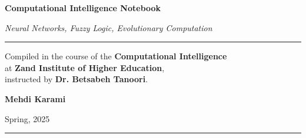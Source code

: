 \begin{titlepage}
    \centering
    \vspace*{2cm}

    {\Huge\bfseries Computational Intelligence Notebook \par}
    \vspace{0.5cm}

    {\large\textit{Neural Networks, Fuzzy Logic, Evolutionary Computation} \par}
    \vspace{0.25cm}
    \rule{\textwidth}{0.4pt}
    \vfill

    \begin{minipage}{0.85\textwidth}
        \centering
        \color{accent}
        \large
        Compiled in the course of the \textbf{Computational Intelligence}\\ at \textbf{Zand Institute of Higher Education}, \\ instructed by \textbf{Dr. Betsabeh Tanoori}.
    \end{minipage}

    \vfill

    {\large\textbf{Mehdi Karami} \par}
    \vspace{0.5cm}
    {\large Spring, 2025 \par}
    \vspace{0.5cm}
    \rule{\textwidth}{0.4pt}
    \vspace{1.5cm}

\end{titlepage}